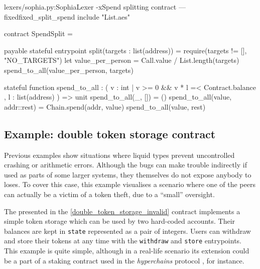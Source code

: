 \begin{code}[H]{lexers/sophia.py:SophiaLexer -x}{Spend splitting contract ---
    fixed}{fixed_split_spend}
include "List.aes"

contract SpendSplit =

  payable stateful entrypoint split(targets : list(address)) =
    require(targets != [], "NO_TARGETS")
    let value_per_person = Call.value / List.length(targets)
    spend_to_all(value_per_person, targets)

  stateful function
    spend_to_all : ( {v : int | v >= 0 && v * l =< Contract.balance}
                   , {l : list(address)}
                   ) => unit
    spend_to_all(_, []) = ()
    spend_to_all(value, addr::rest) =
      Chain.spend(addr, value)
      spend_to_all(value, rest)
\end{code}

\subsection{Example: double token storage contract}
\label{double_token_storage}

Previous examples show situations where liquid types prevent uncontrolled
crashing or arithmetic errors. Although the bugs can make trouble indirectly if
used as parts of some larger systems, they themselves do not expose anybody to
loses. To cover this case, this example visualises a scenario where one of the
peers can actually be a victim of a token theft, due to a ``small'' oversight.

The presented in the \autoref{double_token_storage_invalid} contract implements a
simple token storage which can be used by two hard-coded accounts. Their
balances are kept in \texttt{state} represented as a pair of integers. Users can
withdraw and store their tokens at any time with the \texttt{withdraw} and
\texttt{store} entrypoints. This example is quite simple, although in a
real-life scenario its extension could be a part of a staking contract used in
the \emph{hyperchains} protocol \cite{hyperchains}, for instance.

